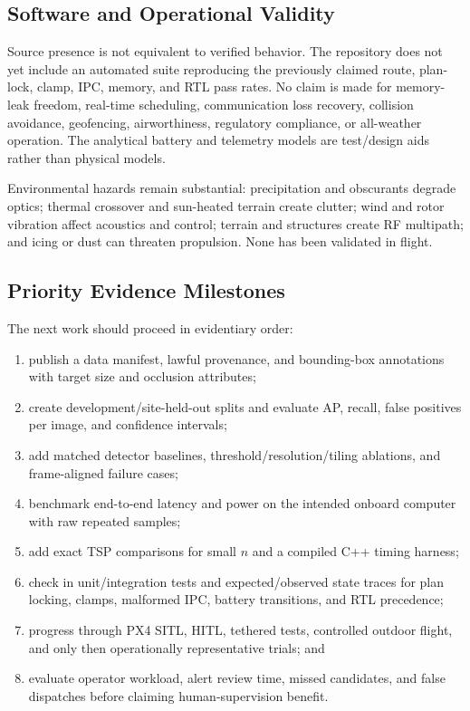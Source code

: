 \subsection{Software and Operational Validity}

Source presence is not equivalent to verified behavior. The repository does not yet include an automated suite reproducing the previously claimed route, plan-lock, clamp, IPC, memory, and RTL pass rates. No claim is made for memory-leak freedom, real-time scheduling, communication loss recovery, collision avoidance, geofencing, airworthiness, regulatory compliance, or all-weather operation. The analytical battery and telemetry models are test/design aids rather than physical models.

Environmental hazards remain substantial: precipitation and obscurants degrade optics; thermal crossover and sun-heated terrain create clutter; wind and rotor vibration affect acoustics and control; terrain and structures create RF multipath; and icing or dust can threaten propulsion. None has been validated in flight.

\subsection{Priority Evidence Milestones}

The next work should proceed in evidentiary order:
\begin{enumerate}
    \item publish a data manifest, lawful provenance, and bounding-box annotations with target size and occlusion attributes;
    \item create development/site-held-out splits and evaluate AP, recall, false positives per image, and confidence intervals;
    \item add matched detector baselines, threshold/resolution/tiling ablations, and frame-aligned failure cases;
    \item benchmark end-to-end latency and power on the intended onboard computer with raw repeated samples;
    \item add exact TSP comparisons for small $n$ and a compiled C++ timing harness;
    \item check in unit/integration tests and expected/observed state traces for plan locking, clamps, malformed IPC, battery transitions, and RTL precedence;
    \item progress through PX4 SITL, HITL, tethered tests, controlled outdoor flight, and only then operationally representative trials; and
    \item evaluate operator workload, alert review time, missed candidates, and false dispatches before claiming human-supervision benefit.
\end{enumerate}
